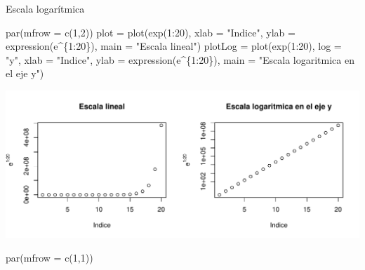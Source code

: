 \documentclass[
  ignorenonframetext,
  aspectratio=169]{beamer}
\newenvironment{Shaded}{\begin{snugshade}}{\end{snugshade}}
\newcommand{\AttributeTok}[1]{\textcolor[rgb]{0.77,0.63,0.00}{#1}}
\newcommand{\DecValTok}[1]{\textcolor[rgb]{0.00,0.00,0.81}{#1}}
\newcommand{\FunctionTok}[1]{\textcolor[rgb]{0.00,0.00,0.00}{#1}}
\newcommand{\NormalTok}[1]{#1}
\newcommand{\OtherTok}[1]{\textcolor[rgb]{0.56,0.35,0.01}{#1}}
\newcommand{\SpecialCharTok}[1]{\textcolor[rgb]{0.00,0.00,0.00}{#1}}
\newcommand{\StringTok}[1]{\textcolor[rgb]{0.31,0.60,0.02}{#1}}
\begin{document}
\begin{frame}[fragile]{Escala logarítmica}
\protect\hypertarget{escala-logaruxedtmica}{}
\begin{Shaded}
\begin{Highlighting}[]
\FunctionTok{par}\NormalTok{(}\AttributeTok{mfrow =} \FunctionTok{c}\NormalTok{(}\DecValTok{1}\NormalTok{,}\DecValTok{2}\NormalTok{))}
\NormalTok{plot }\OtherTok{=} \FunctionTok{plot}\NormalTok{(}\FunctionTok{exp}\NormalTok{(}\DecValTok{1}\SpecialCharTok{:}\DecValTok{20}\NormalTok{), }\AttributeTok{xlab =} \StringTok{"Indice"}\NormalTok{,}
            \AttributeTok{ylab =} \FunctionTok{expression}\NormalTok{(e}\SpecialCharTok{\^{}}\NormalTok{\{}\DecValTok{1}\SpecialCharTok{:}\DecValTok{20}\NormalTok{\}), }
            \AttributeTok{main =} \StringTok{"Escala lineal"}\NormalTok{)}
\NormalTok{plotLog }\OtherTok{=} \FunctionTok{plot}\NormalTok{(}\FunctionTok{exp}\NormalTok{(}\DecValTok{1}\SpecialCharTok{:}\DecValTok{20}\NormalTok{), }\AttributeTok{log =} \StringTok{"y"}\NormalTok{, }\AttributeTok{xlab =} \StringTok{"Indice"}\NormalTok{, }
               \AttributeTok{ylab =} \FunctionTok{expression}\NormalTok{(e}\SpecialCharTok{\^{}}\NormalTok{\{}\DecValTok{1}\SpecialCharTok{:}\DecValTok{20}\NormalTok{\}), }
               \AttributeTok{main =} \StringTok{"Escala logaritmica en el eje y"}\NormalTok{)}
\end{Highlighting}
\end{Shaded}

\begin{center}\includegraphics[width=0.7\linewidth]{Hora2_files/figure-beamer/unnamed-chunk-10-1} \end{center}

\begin{Shaded}
\begin{Highlighting}[]
\FunctionTok{par}\NormalTok{(}\AttributeTok{mfrow =} \FunctionTok{c}\NormalTok{(}\DecValTok{1}\NormalTok{,}\DecValTok{1}\NormalTok{))}
\end{Highlighting}
\end{Shaded}
\end{frame}
\end{document}
